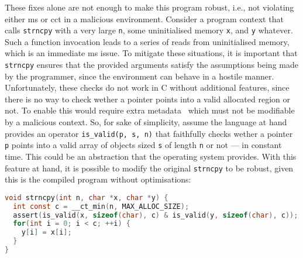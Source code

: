 \documentclass[utf8,acmsmall,review,screen,dvipsnames]{acmart}
\begin{document}
\begin{example}[strncpy]
These fixes alone are not enough to make this program robust, i.e., not violating either \gls{ms} or \gls{cct} in a malicious environment.
Consider a program context that calls \texttt{strncpy} with a very large \texttt{n}, some uninitialised memory \texttt{x}, and \texttt{y} whatever.
Such a function invocation leads to a series of reads from uninitialised memory, which is an immediate \gls{ms} issue.
To mitigate these situations, it is important that \texttt{strncpy} ensures that the provided arguments satisfy the assumptions being made by the programmer, since the environment can behave in a hostile manner.
Unfortunately, these checks do not work in C without additional features, since there is no way to check wether a pointer points into a valid allocated region or not.
To enable this would require extra metadata~\cite{kwon2013lowfat,akritidis2009baggy} which must not be modifiable by a malicious context.
So, for sake of simplicity, assume the language at hand provides an operator \texttt{is\_valid(p, s, n)} that faithfully checks wether a pointer \texttt{p} points into a valid array of objects sized \texttt{s} of length \texttt{n} or not --- in constant time.
This could be an abstraction that the operating system provides.
With this feature at hand, it is possible to modify the original \texttt{strncpy} to be robust, given this is the compiled program without optimisations:

\begin{lstlisting}[language=c,basicstyle=\small\ttfamily]
void strncpy(int n, char *x, char *y) {
  int const c = __ct_min(n, MAX_ALLOC_SIZE);
  assert(is_valid(x, sizeof(char), c) & is_valid(y, sizeof(char), c));
  for(int i = 0; i < c; ++i) {
    y[i] = x[i];
  }
}
\end{lstlisting}
\end{example}
\end{document}
